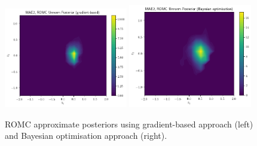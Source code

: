 \begin{figure}[h]
    \begin{center}
      \includegraphics[width=0.48\textwidth]{./Thesis/images/chapter4/mae2_romc_posterior.png}
      \includegraphics[width=0.48\textwidth]{./Thesis/images/chapter4/mae2_romc_posterior_bo.png}
    \end{center}
  \caption{ROMC approximate posteriors using gradient-based approach (left) and Bayesian optimisation approach (right).}
  \label{fig:ma2_4}
\end{figure}

